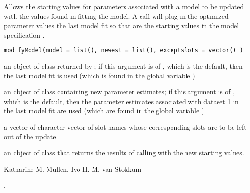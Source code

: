 \begin{Description}\relax
Allows the starting values for parameters associated with 
a model to be updated with the values found in fitting the model.  
A call 
will plug in the optimized parameter values the last model fit
so that are the starting values in the model specification 
.
\end{Description}
\begin{Usage}
\begin{verbatim}
modifyModel(model = list(), newest = list(), exceptslots = vector() )
\end{verbatim}
\end{Usage}
\begin{Arguments}
\begin{ldescription}
\item[\code{model}] an object of class  returned by ;
if this argument is of , which is the default, then the 
last model fit is used (which is found in the global variable 
)
\item[\code{newest}] an object of class  containing new parameter
estimates;    if this argument is of , which is the default, 
then the parameter estimates associated with dataset 1 in the last model fit
are used (which are found in 
the global variable )
\item[\code{exceptslots}] a vector of character vector of slot names whose 
corresponding slots are to be left out of the update
\end{ldescription}
\end{Arguments}
\begin{Value}
an object of class  that returns the results of 
calling  with the new starting values.
\end{Value}
\begin{Author}\relax
Katharine M. Mullen, Ivo H. M. van Stokkum
\end{Author}
\begin{SeeAlso}\relax
{}, 
\end{SeeAlso}

